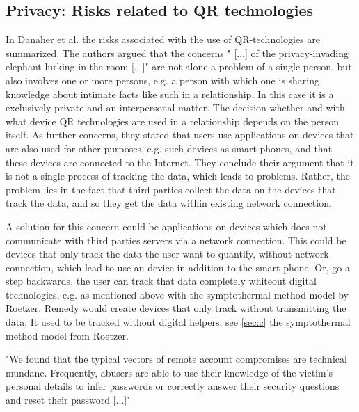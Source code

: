 

\subsection{Privacy: Risks related to \acs{QR} technologies}
In Danaher et al. \cite{doi:10.1080/15265161.2017.1422294} the risks associated with the use of \acs{QR}-technologies are summarized.
The authors argued that the concerns " [...] of the privacy-invading elephant lurking in the room [...]" are not alone a problem of a single person, but also involves one or more persons, e.g. a person with which one is sharing knowledge about intimate facts like such in a relationship. In this case it is a exclusively private and an interpersonal matter. The decision whether and with what device \acs{QR} technologies are used in a relationship depends on the person itself.
As further concerns, they stated that users use applications on devices that are also used for other purposes, e.g. such devices as smart phones, and that these devices are connected to the Internet. 
They conclude their argument that it is not a single process of tracking the data, which leads to problems. Rather, the problem lies in the fact that third parties collect the data on the devices that track the data, and so they get the data within existing network connection.

A solution for this concern could be applications on devices which does not communicate with third parties servers via a network connection. This could be devices that only track the data the user want to quantify, without network connection, which lead to use an device in addition to the smart phone.
Or, go a step backwards, the user can track that data completely whiteout digital technologies, e.g. as mentioned above with the symptothermal method model by Roetzer.
Remedy would create devices that only track without transmitting the data.
It used to be tracked without digital helpers, see  \ref{sec:c} the symptothermal method model from Roetzer. %



"We found that the typical vectors of remote account compromises are technical mundane. Frequently, abusers are able to use their knowledge of the victim's personal details to infer passwords or correctly answer their security questions and reset their password [...]" \cite{freed2018stalker}
